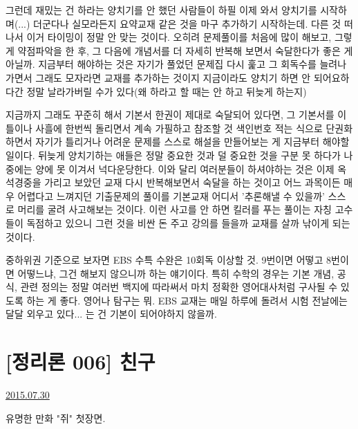 그런데 재밌는 건 하라는 양치기를 안 했던 사람들이 하필 이제 와서 양치기를 시작하며(...)
더군다나 실모라든지 요약교재 같은 것을 마구 추가하기 시작하는데. 다른 것 떠나서 이거 타이밍이 정말 안 맞는 것이다.
오히려 문제풀이를 처음에 많이 해보고, 그렇게 약점파악을 한 후, 그 다음에 개념서를 더 자세히 반복해 보면서 숙달한다가 좋은 게 아닐까.
지금부터 해야하는 것은 자기가 풀었던 문제집 다시 훑고 그 회독수를 늘려나가면서 그래도 모자라면 교재를 추가하는 것이지
지금이라도 양치기 하면 안 되어요하다간 정말 날라가버릴 수가 있다(왜 하라고 할 때는 안 하고 뒤늦게 하는지)
\vspace{5mm}

지금까지 그래도 꾸준히 해서 기본서 한권이 제대로 숙달되어 있다면, 그 기본서를 이틀이나 사흘에 한번씩 돌리면서
계속 가필하고 참조할 것 색인번호 적는 식으로 단권화하면서 자기가 틀리거나 어려운 문제를 스스로 해설을 만들어보는 게 지금부터 해야할 일이다.
뒤늦게 양치기하는 애들은 정말 중요한 것과 덜 중요한 것을 구분 못 하다가 나중에는 양에 못 이겨서 넉다운당한다.
이와 달리 여러분들이 하셔야하는 것은 이제 옥석경중을 가리고 보았던 교재 다시 반복해보면서 숙달을 하는 것이고
어느 과목이든 매우 어렵다고 느껴지던 기출문제의 풀이를 기본교재 어디서 '추론해낼 수 있을까' 스스로 머리를 굴려 사고해보는 것이다.
이런 사고를 안 하면 킬러를 푸는 풀이는 자칭 고수들이 독점하고 있으니 그런 것을 비싼 돈 주고 강의를 들을까 교재를 살까 낚이게 되는 것이다.
\vspace{5mm}

중하위권 기준으로 보자면 EBS 수특 수완은 10회독 이상할 것. 9번이면 어떻고 8번이면 어떻느냐, 그건 해보지 않으니까 하는 얘기이다.
특히 수학의 경우는 기본 개념, 공식, 관련 정의는 정말 여러번 백지에 따라써서 마치 정확한 영어대사처럼 구사될 수 있도록 하는 게 좋다.
영어나 탐구는 뭐. EBS 교재는 매일 하루에 돌려서 시험 전날에는 달달 외우고 있다... 는 건 기본이 되어야하지 않을까.
\vspace{5mm}






\section{[정리론 006] 친구}
\href{https://www.kockoc.com/Apoc/222305}{2015.07.30}

\vspace{5mm}

유명한 만화 "쥐" 첫장면.
\vspace{5mm}

